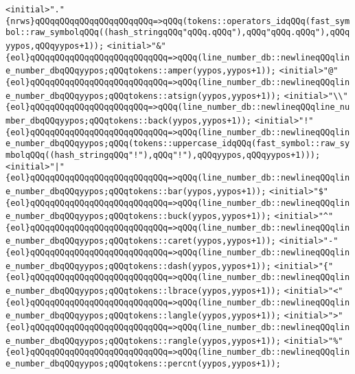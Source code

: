 \verb|<initial>"."{nrws}qQQqqQQqqQQqqQQqqQQqqQQq=>qQQq(tokens::operators_idqQQq(fast_symbol::raw_symbolqQQq((hash_stringqQQq"qQQq.qQQq"),qQQq"qQQq.qQQq"),qQQqyypos,qQQqyypos+1));|\newline
\verb|<initial>"&"{eol}qQQqqQQqqQQqqQQqqQQqqQQqqQQq=>qQQq(line_number_db::newlineqQQqline_number_dbqQQqyypos;qQQqtokens::amper(yypos,yypos+1));|\newline
\verb|<initial>"@"{eol}qQQqqQQqqQQqqQQqqQQqqQQqqQQq=>qQQq(line_number_db::newlineqQQqline_number_dbqQQqyypos;qQQqtokens::atsign(yypos,yypos+1));|\newline
\verb|<initial>"\\"{eol}qQQqqQQqqQQqqQQqqQQqqQQq=>qQQq(line_number_db::newlineqQQqline_number_dbqQQqyypos;qQQqtokens::back(yypos,yypos+1));|\newline
\verb|<initial>"!"{eol}qQQqqQQqqQQqqQQqqQQqqQQqqQQq=>qQQq(line_number_db::newlineqQQqline_number_dbqQQqyypos;qQQq(tokens::uppercase_idqQQq(fast_symbol::raw_symbolqQQq((hash_stringqQQq"!"),qQQq"!"),qQQqyypos,qQQqyypos+1)));|\newline
\verb|<initial>"|\verb#|"{eol}qQQqqQQqqQQqqQQqqQQqqQQqqQQq=>qQQq(line_number_db::newlineqQQqline_number_dbqQQqyypos;qQQqtokens::bar(yypos,yypos+1));#\newline
\verb|<initial>"$"{eol}qQQqqQQqqQQqqQQqqQQqqQQqqQQq=>qQQq(line_number_db::newlineqQQqline_number_dbqQQqyypos;qQQqtokens::buck(yypos,yypos+1));|\newline
\verb|<initial>"^"{eol}qQQqqQQqqQQqqQQqqQQqqQQqqQQq=>qQQq(line_number_db::newlineqQQqline_number_dbqQQqyypos;qQQqtokens::caret(yypos,yypos+1));|\newline
\verb|<initial>"-"{eol}qQQqqQQqqQQqqQQqqQQqqQQqqQQq=>qQQq(line_number_db::newlineqQQqline_number_dbqQQqyypos;qQQqtokens::dash(yypos,yypos+1));|\newline
\verb|<initial>"{"{eol}qQQqqQQqqQQqqQQqqQQqqQQqqQQq=>qQQq(line_number_db::newlineqQQqline_number_dbqQQqyypos;qQQqtokens::lbrace(yypos,yypos+1));|\newline
\verb|<initial>"<"{eol}qQQqqQQqqQQqqQQqqQQqqQQqqQQq=>qQQq(line_number_db::newlineqQQqline_number_dbqQQqyypos;qQQqtokens::langle(yypos,yypos+1));|\newline
\verb|<initial>">"{eol}qQQqqQQqqQQqqQQqqQQqqQQqqQQq=>qQQq(line_number_db::newlineqQQqline_number_dbqQQqyypos;qQQqtokens::rangle(yypos,yypos+1));|\newline
\verb|<initial>"%"{eol}qQQqqQQqqQQqqQQqqQQqqQQqqQQq=>qQQq(line_number_db::newlineqQQqline_number_dbqQQqyypos;qQQqtokens::percnt(yypos,yypos+1));|\newline
